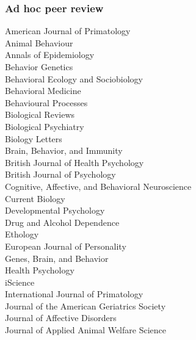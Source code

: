 \documentclass[11pt]{article}
\begin{document}
\subsubsection*{Ad hoc peer review}

\begin{minipage}[t]{0.49\linewidth}
  American Journal of Primatology \\
  Animal Behaviour \\
  Annals of Epidemiology \\
  Behavior Genetics \\
  Behavioral Ecology and Sociobiology \\
  Behavioral Medicine \\
  Behavioural Processes \\
  Biological Reviews \\
  Biological Psychiatry \\
  Biology Letters \\
  Brain, Behavior, and Immunity \\
  British Journal of Health Psychology \\
  British Journal of Psychology \\
  Cognitive, Affective, and Behavioral Neuroscience \\
  Current Biology \\
  Developmental Psychology \\
  Drug and Alcohol Dependence \\
  Ethology \\
  European Journal of Personality \\
  Genes, Brain, and Behavior \\
  Health Psychology \\
  iScience \\
  International Journal of Primatology \\
  Journal of the American Geriatrics Society \\
  Journal of Affective Disorders \\
  Journal of Applied Animal Welfare Science

\end{minipage}
\hfill
\end{document}
